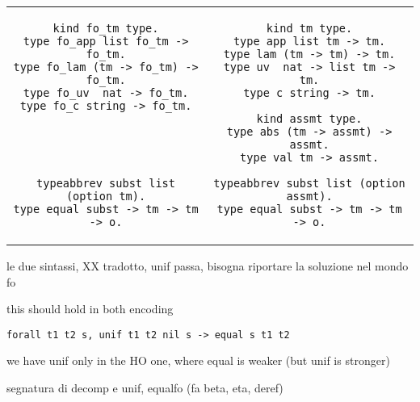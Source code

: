 \documentclass{rapport}
\begin{document}
\begin{tabular}{c|c}
\begin{minipage}{.5\textwidth}
\begin{verbatim}
kind fo_tm type.
type fo_app list fo_tm -> fo_tm.
type fo_lam (tm -> fo_tm) -> fo_tm.
type fo_uv  nat -> fo_tm.
type fo_c string -> fo_tm.





typeabbrev subst list (option tm).
type equal subst -> tm -> tm -> o.
\end{verbatim}
\end{minipage}
&
\begin{minipage}{.5\textwidth}
\begin{verbatim}
kind tm type.
type app list tm -> tm.
type lam (tm -> tm) -> tm.
type uv  nat -> list tm -> tm.
type c string -> tm.

kind assmt type.
type abs (tm -> assmt) -> assmt.
type val tm -> assmt.

typeabbrev subst list (option assmt).
type equal subst -> tm -> tm -> o.
\end{verbatim}
\end{minipage}
\end{tabular}

le due sintassi, XX tradotto, unif passa, bisogna riportare la soluzione
nel mondo fo

this should hold in both encoding
\begin{verbatim}
forall t1 t2 s, unif t1 t2 nil s -> equal s t1 t2
\end{verbatim}
we have unif only in the HO one, where equal is
weaker (but unif is stronger)

segnatura di decomp e unif, equalfo (fa beta, eta, deref)
\end{document}
